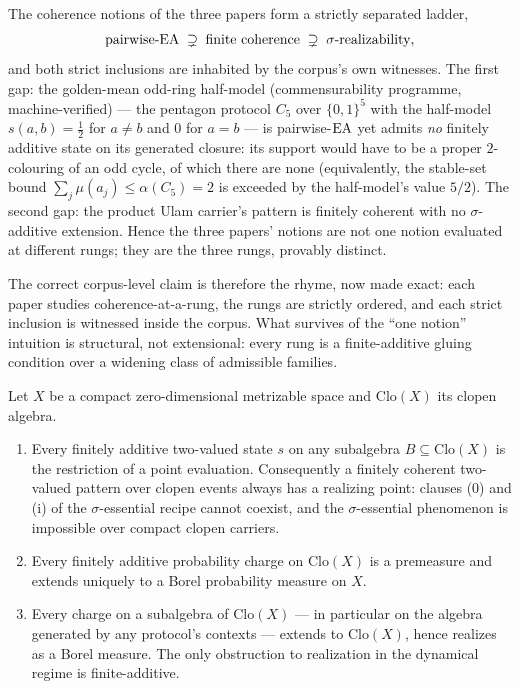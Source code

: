\begin{proposition}\label{prop:ladder}
The coherence notions of the three papers form a strictly separated ladder,
\[
  \text{pairwise-}\mathrm{EA} \;\supsetneq\; \text{finite coherence}
  \;\supsetneq\; \sigma\text{-realizability},
\]
and both strict inclusions are inhabited by the corpus's own witnesses. The first
gap: the golden-mean odd-ring half-model (commensurability programme,
machine-verified) --- the pentagon protocol $C_5$ over $\{0,1\}^5$ with the
half-model $s(a,b)=\tfrac12$ for $a\neq b$ and $0$ for $a=b$ --- is pairwise-$\mathrm{EA}$
yet admits \emph{no} finitely additive state on its generated closure: its
support would have to be a proper $2$-colouring of an odd cycle, of which there
are none (equivalently, the stable-set bound $\sum_j \mu(a_j)\le\alpha(C_5)=2$ is
exceeded by the half-model's value $5/2$). The second gap: the product Ulam
carrier's pattern is finitely coherent with no $\sigma$-additive extension. Hence
the three papers' notions are not one notion evaluated at different rungs; they
are the three rungs, provably distinct.
\end{proposition}

\begin{remark}
The correct corpus-level claim is therefore the rhyme, now made exact: each paper
studies coherence-at-a-rung, the rungs are strictly ordered, and each strict
inclusion is witnessed inside the corpus. What survives of the ``one notion''
intuition is structural, not extensional: every rung is a finite-additive gluing
condition over a widening class of admissible families.
\end{remark}

\begin{theorem}[quarantine]\label{thm:quarantine}
Let $X$ be a compact zero-dimensional metrizable space and $\mathrm{Clo}(X)$ its
clopen algebra.
\begin{enumerate}[label=\textup{(\roman*)}]
\item Every finitely additive two-valued state $s$ on any subalgebra
  $B \subseteq \mathrm{Clo}(X)$ is the restriction of a point evaluation.
  Consequently a finitely coherent two-valued pattern over clopen events always
  has a realizing point: clauses \textup{(0)} and \textup{(i)} of the
  $\sigma$-essential recipe cannot coexist, and the $\sigma$-essential phenomenon
  is impossible over compact clopen carriers.
\item Every finitely additive probability charge on $\mathrm{Clo}(X)$ is a
  premeasure and extends uniquely to a Borel probability measure on $X$.
\item Every charge on a subalgebra of $\mathrm{Clo}(X)$ --- in particular on the
  algebra generated by any protocol's contexts --- extends to $\mathrm{Clo}(X)$,
  hence realizes as a Borel measure. The only obstruction to realization in the
  dynamical regime is finite-additive.
\end{enumerate}
\end{theorem}

